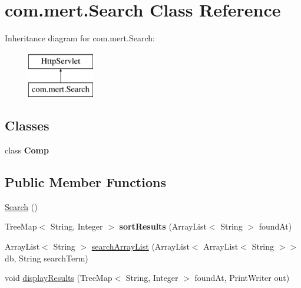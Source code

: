 \hypertarget{classcom_1_1mert_1_1_search}{}\section{com.\+mert.\+Search Class Reference}
\label{classcom_1_1mert_1_1_search}
Inheritance diagram for com.\+mert.\+Search\+:\begin{figure}[H]
\begin{center}
\leavevmode
\includegraphics[height=2.000000cm]{classcom_1_1mert_1_1_search}
\end{center}
\end{figure}
\subsection*{Classes}
\begin{DoxyCompactItemize}
\item 
class {\bfseries Comp}
\end{DoxyCompactItemize}
\subsection*{Public Member Functions}
\begin{DoxyCompactItemize}
\item 
\hyperlink{classcom_1_1mert_1_1_search_adb57f5c1f90037b37445e6caddbae989}{Search} ()
\item 
Tree\+Map$<$ String, Integer $>$ {\bfseries sort\+Results} (Array\+List$<$ String $>$ found\+At)\hypertarget{classcom_1_1mert_1_1_search_a0ad68f9506cfbba9d149930d76aceca6}{}\label{classcom_1_1mert_1_1_search_a0ad68f9506cfbba9d149930d76aceca6}

\item 
Array\+List$<$ String $>$ \hyperlink{classcom_1_1mert_1_1_search_a07fd75951344d799a0b03eff2a3d7711}{search\+Array\+List} (Array\+List$<$ Array\+List$<$ String $>$$>$ db, String search\+Term)
\item 
void \hyperlink{classcom_1_1mert_1_1_search_a2c25c0cf503bcc464fea33af4869ac42}{display\+Results} (Tree\+Map$<$ String, Integer $>$ found\+At, Print\+Writer out)
\end{DoxyCompactItemize}
